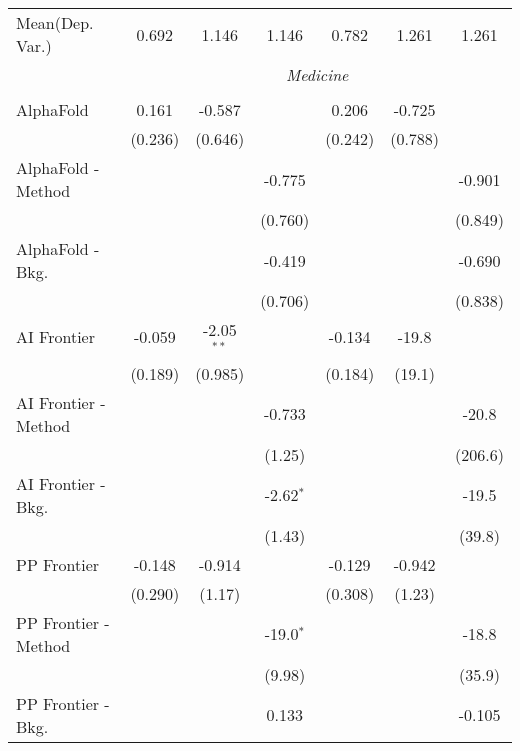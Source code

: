 \begin{tabular}{lcccccc}
Mean(Dep. Var.) & 0.692 & 1.146 & 1.146 & 0.782 & 1.261 & 1.261 \\
 & \multicolumn{6}{c}{\textit{Medicine}} \\ \\
   AlphaFold            & 0.161   & -0.587       &             & 0.206        & -0.725     &   \\   
                        & (0.236) & (0.646)      &             & (0.242)      & (0.788)    &   \\   
   AlphaFold - Method   &         &              & -0.775      &              &            & -0.901\\   
                        &         &              & (0.760)     &              &            & (0.849)\\   
   AlphaFold - Bkg.     &         &              & -0.419      &              &            & -0.690\\   
                        &         &              & (0.706)     &              &            & (0.838)\\   
   AI Frontier          & -0.059  & -2.05$^{**}$ &             & -0.134       & -19.8      &   \\   
                        & (0.189) & (0.985)      &             & (0.184)      & (19.1)     &   \\   
   AI Frontier - Method &         &              & -0.733      &              &            & -20.8\\   
                        &         &              & (1.25)      &              &            & (206.6)\\   
   AI Frontier - Bkg.   &         &              & -2.62$^{*}$ &              &            & -19.5\\   
                        &         &              & (1.43)      &              &            & (39.8)\\   
   PP Frontier          & -0.148  & -0.914       &             & -0.129       & -0.942     &   \\   
                        & (0.290) & (1.17)       &             & (0.308)      & (1.23)     &   \\   
   PP Frontier - Method &         &              & -19.0$^{*}$ &              &            & -18.8\\   
                        &         &              & (9.98)      &              &            & (35.9)\\   
   PP Frontier - Bkg.   &         &              & 0.133       &              &            & -0.105\\   

\end{tabular}

